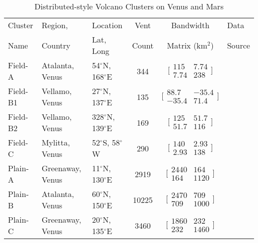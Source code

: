 \begin{table}[t!]
\centering
\caption{Distributed-style Volcano Clusters on Venus and Mars}
\begin{tabular}{p{2cm} p{2.5cm} p{2cm} c c p{4cm}}
\toprule
Cluster	&	Region, &	Location	&	Vent &	Bandwidth	&	Data\\
Name		& Country	&	Lat, Long	&	Count	&	Matrix (km$^2$)	&Source\\
\midrule
Field-A	&	Atalanta, Venus	&	54$^{\circ}$N, 168$^{\circ}$E	&	344	&	$\bigl[\begin{smallmatrix} 115&7.74\\7.74&238 \end{smallmatrix}\bigr]$	&	\citet{miller2012shield}\\
Field-B1	&	Vellamo, Venus	&	27$^{\circ}$N, 137$^{\circ}$E	&	135	&	$\bigl[\begin{smallmatrix} 88.7&-35.4\\-35.4&71.4 \end{smallmatrix}\bigr]$	&	\citet{miller2012shield}\\
Field-B2	&	Vellamo, Venus	&	328$^{\circ}$N, 139$^{\circ}$E	&	169	&	$\bigl[\begin{smallmatrix} 125&51.7\\51.7&116 \end{smallmatrix}\bigr]$	&	\citet{miller2012shield}\\
Field-C	&	Mylitta, Venus	&	52$^{\circ}$S, 58$^{\circ}$W	&	290	&	$\bigl[\begin{smallmatrix} 140&2.93\\2.93&138 \end{smallmatrix}\bigr]$	&	\citet{miller2012shield}\\
Plain-A	&	Greenaway, Venus	&	11$^{\circ}$N, 130$^{\circ}$E	&	2919	&	$\bigl[\begin{smallmatrix} 2440&164\\164&1120 \end{smallmatrix}\bigr]$	&	\citet{miller2012shield}\\
Plain-B	&	Atalanta, Venus	&	60$^{\circ}$N, 150$^{\circ}$E	&	10225	&	$\bigl[\begin{smallmatrix} 2470&709\\709&1000 \end{smallmatrix}\bigr]$	&	\citet{miller2012shield}\\
Plain-C	&	Greenaway, Venus	&	20$^{\circ}$N, 135$^{\circ}$E	&	3460	&	$\bigl[\begin{smallmatrix} 1860&232\\232&1460 \end{smallmatrix}\bigr]$	&	\citet{miller2012shield}\\

\end{tabular}
\end{table}
